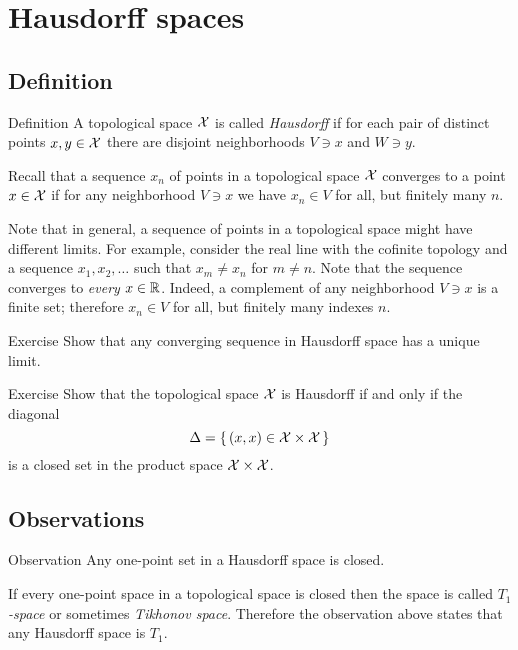 \chapter{Hausdorff spaces}

\section{Definition}

\begin{thm}{Definition} 
A topological space $\mathcal{X}$ is called \emph{Hausdorff} if for each pair of distinct points
$x, y \in \mathcal{X}$ there are disjoint neighborhoods $V\ni x$ and $W\ni y$.
\end{thm}

Recall that a sequence $x_n$ of points in a topological space $\mathcal{X}$ converges to a point $x\in  \mathcal{X}$
if for any neighborhood $V\ni x$ we have 
$x_n\in V$ for all, but finitely many $n$.

Note that in general, a sequence of points in a topological space might have different limits.
For example, consider the real line with the cofinite topology and a sequence $x_1,x_2,\dots$ such that $x_m\ne x_n$ for $m\ne n$.
Note that the sequence converges to \textit{every} $x\in \mathbb{R}$.
Indeed, a complement of any neighborhood $V\ni x$ is a finite set;
therefore $x_n\in V$ for all, but finitely many indexes $n$.

\begin{thm}{Exercise}\label{ex:hausdorff-unique-limit}
Show that any converging sequence in Hausdorff space has a unique limit.
\end{thm}


\begin{thm}{Exercise}\label{ex:hausdorff-diagonal}
Show that the topological space $\mathcal{X}$ is Hausdorff
if and only if the diagonal 
\[\Delta=\{\,(x,x)\in \mathcal{X}\times\mathcal{X}\,\}\]
is a closed set in the product space $\mathcal{X}\times\mathcal{X}$.
\end{thm}

\section{Observations}

\begin{thm}{Observation}\label{obs:one-point=compact}
Any one-point set in a Hausdorff space is closed. 
\end{thm}

If every one-point space in a topological space is closed
then the space is called \emph{$T_1$-space} or sometimes \emph{Tikhonov space}.
Therefore the observation above states that any Hausdorff space is $T_1$.

